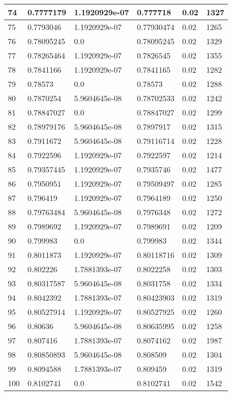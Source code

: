 \begin{longtable}{|l|l|l|l|l|l|}
74 & 0.7777179 & 1.1920929e-07 & 0.777718 & 0.02 & 1327 \\ \hline 
75 & 0.7793046 & 1.1920929e-07 & 0.77930474 & 0.02 & 1265 \\ \hline 
76 & 0.78095245 & 0.0 & 0.78095245 & 0.02 & 1329 \\ \hline 
77 & 0.78265464 & 1.1920929e-07 & 0.7826545 & 0.02 & 1355 \\ \hline 
78 & 0.7841166 & 1.1920929e-07 & 0.7841165 & 0.02 & 1282 \\ \hline 
79 & 0.78573 & 0.0 & 0.78573 & 0.02 & 1288 \\ \hline 
80 & 0.7870254 & 5.9604645e-08 & 0.78702533 & 0.02 & 1242 \\ \hline 
81 & 0.78847027 & 0.0 & 0.78847027 & 0.02 & 1299 \\ \hline 
82 & 0.78979176 & 5.9604645e-08 & 0.7897917 & 0.02 & 1315 \\ \hline 
83 & 0.7911672 & 5.9604645e-08 & 0.79116714 & 0.02 & 1228 \\ \hline 
84 & 0.7922596 & 1.1920929e-07 & 0.7922597 & 0.02 & 1214 \\ \hline 
85 & 0.79357445 & 1.1920929e-07 & 0.7935746 & 0.02 & 1477 \\ \hline 
86 & 0.7950951 & 1.1920929e-07 & 0.79509497 & 0.02 & 1285 \\ \hline 
87 & 0.796419 & 1.1920929e-07 & 0.7964189 & 0.02 & 1250 \\ \hline 
88 & 0.79763484 & 5.9604645e-08 & 0.7976348 & 0.02 & 1272 \\ \hline 
89 & 0.7989692 & 1.1920929e-07 & 0.7989691 & 0.02 & 1209 \\ \hline 
90 & 0.799983 & 0.0 & 0.799983 & 0.02 & 1344 \\ \hline 
91 & 0.8011873 & 1.1920929e-07 & 0.80118716 & 0.02 & 1309 \\ \hline 
92 & 0.802226 & 1.7881393e-07 & 0.8022258 & 0.02 & 1303 \\ \hline 
93 & 0.80317587 & 5.9604645e-08 & 0.8031758 & 0.02 & 1334 \\ \hline 
94 & 0.8042392 & 1.7881393e-07 & 0.80423903 & 0.02 & 1319 \\ \hline 
95 & 0.80527914 & 1.1920929e-07 & 0.80527925 & 0.02 & 1260 \\ \hline 
96 & 0.80636 & 5.9604645e-08 & 0.80635995 & 0.02 & 1258 \\ \hline 
97 & 0.807416 & 1.7881393e-07 & 0.8074162 & 0.02 & 1987 \\ \hline 
98 & 0.80850893 & 5.9604645e-08 & 0.808509 & 0.02 & 1304 \\ \hline 
99 & 0.8094588 & 1.7881393e-07 & 0.809459 & 0.02 & 1319 \\ \hline 
100 & 0.8102741 & 0.0 & 0.8102741 & 0.02 & 1542 \\ \hline 
\end{longtable}